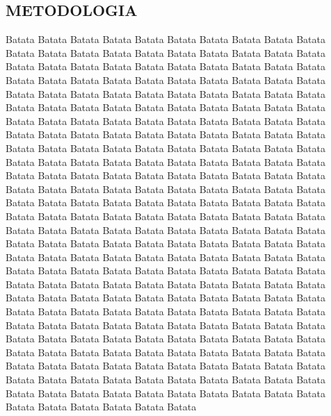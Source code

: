 \begin{flushright}

    \justify

    \titleformat{\section}{\large\bfseries}{\thesection}{1em}{}
    \titleformat{\subsection}{\normalfont\large}{\thesubsection}{1em}{}

    \section{METODOLOGIA}
    \vspace{0.5cm}
 
    Batata Batata Batata Batata Batata Batata Batata Batata Batata Batata Batata Batata 
    Batata Batata Batata Batata Batata Batata Batata Batata Batata Batata Batata Batata 
    Batata Batata Batata Batata Batata Batata Batata Batata Batata Batata Batata Batata 
    Batata Batata Batata Batata Batata Batata Batata Batata Batata Batata Batata Batata 
    Batata Batata Batata Batata Batata Batata Batata Batata Batata Batata Batata Batata 
    Batata Batata Batata Batata Batata Batata Batata Batata Batata Batata Batata Batata 
    Batata Batata Batata Batata Batata Batata Batata Batata Batata Batata Batata Batata 
    Batata Batata Batata Batata Batata Batata Batata Batata Batata Batata Batata Batata 
    Batata Batata Batata Batata Batata Batata Batata Batata Batata Batata Batata Batata 
    Batata Batata Batata Batata Batata Batata Batata Batata Batata Batata Batata Batata 
    Batata Batata Batata Batata Batata Batata Batata Batata Batata Batata Batata Batata 
    Batata Batata Batata Batata Batata Batata Batata Batata Batata Batata Batata Batata 
    Batata Batata Batata Batata Batata Batata Batata Batata Batata Batata Batata Batata 
    Batata Batata Batata Batata Batata Batata Batata Batata Batata Batata Batata Batata 
    Batata Batata Batata Batata Batata Batata Batata Batata Batata Batata Batata Batata 
    Batata Batata Batata Batata Batata Batata Batata Batata Batata Batata Batata Batata 
    Batata Batata Batata Batata Batata Batata Batata Batata Batata Batata Batata Batata 
    Batata Batata Batata Batata Batata Batata Batata Batata Batata Batata Batata Batata 
    Batata Batata Batata Batata Batata Batata Batata Batata Batata Batata Batata Batata 
    Batata Batata Batata Batata Batata Batata Batata Batata Batata Batata Batata Batata 
    Batata Batata Batata Batata Batata Batata Batata Batata Batata Batata Batata Batata 
    Batata Batata Batata Batata Batata Batata Batata Batata Batata Batata Batata Batata 
    Batata Batata Batata Batata Batata Batata Batata Batata Batata Batata Batata Batata 
    

\end{flushright}
